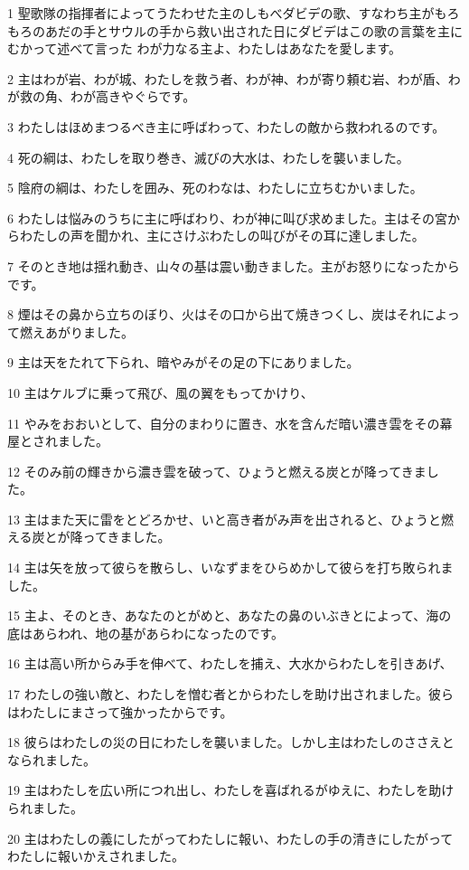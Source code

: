 \par 1 聖歌隊の指揮者によってうたわせた主のしもべダビデの歌、すなわち主がもろもろのあだの手とサウルの手から救い出された日にダビデはこの歌の言葉を主にむかって述べて言った わが力なる主よ、わたしはあなたを愛します。
\par 2 主はわが岩、わが城、わたしを救う者、わが神、わが寄り頼む岩、わが盾、わが救の角、わが高きやぐらです。
\par 3 わたしはほめまつるべき主に呼ばわって、わたしの敵から救われるのです。
\par 4 死の綱は、わたしを取り巻き、滅びの大水は、わたしを襲いました。
\par 5 陰府の綱は、わたしを囲み、死のわなは、わたしに立ちむかいました。
\par 6 わたしは悩みのうちに主に呼ばわり、わが神に叫び求めました。主はその宮からわたしの声を聞かれ、主にさけぶわたしの叫びがその耳に達しました。
\par 7 そのとき地は揺れ動き、山々の基は震い動きました。主がお怒りになったからです。
\par 8 煙はその鼻から立ちのぼり、火はその口から出て焼きつくし、炭はそれによって燃えあがりました。
\par 9 主は天をたれて下られ、暗やみがその足の下にありました。
\par 10 主はケルブに乗って飛び、風の翼をもってかけり、
\par 11 やみをおおいとして、自分のまわりに置き、水を含んだ暗い濃き雲をその幕屋とされました。
\par 12 そのみ前の輝きから濃き雲を破って、ひょうと燃える炭とが降ってきました。
\par 13 主はまた天に雷をとどろかせ、いと高き者がみ声を出されると、ひょうと燃える炭とが降ってきました。
\par 14 主は矢を放って彼らを散らし、いなずまをひらめかして彼らを打ち敗られました。
\par 15 主よ、そのとき、あなたのとがめと、あなたの鼻のいぶきとによって、海の底はあらわれ、地の基があらわになったのです。
\par 16 主は高い所からみ手を伸べて、わたしを捕え、大水からわたしを引きあげ、
\par 17 わたしの強い敵と、わたしを憎む者とからわたしを助け出されました。彼らはわたしにまさって強かったからです。
\par 18 彼らはわたしの災の日にわたしを襲いました。しかし主はわたしのささえとなられました。
\par 19 主はわたしを広い所につれ出し、わたしを喜ばれるがゆえに、わたしを助けられました。
\par 20 主はわたしの義にしたがってわたしに報い、わたしの手の清きにしたがってわたしに報いかえされました。
